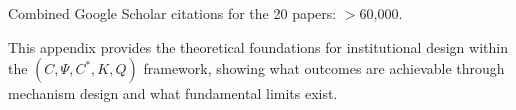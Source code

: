 Combined Google Scholar citations for the 20 papers: $>$60,000.

This appendix provides the theoretical foundations for institutional design 
within the $(C, \Psi, C^*, K, Q)$ framework, showing what outcomes are 
achievable through mechanism design and what fundamental limits exist.

